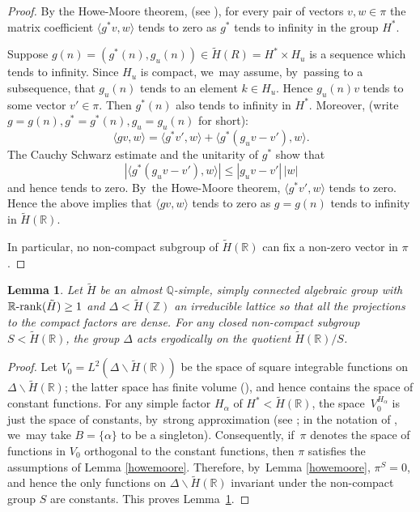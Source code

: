 \documentclass[JEP,XML,SOM,Unicode,published]{cedram}
\let\<\langle
\let\>\rangle
\newcommand{\Rrank}{\R\textup{-}\rank}
\newtheorem{lemma}{Lemma}
\theoremstyle{definition}
\newcommand{\field}[1]{\mathbb{#1}}
\newcommand{\Q}{\field{Q}}
\newcommand{\R}{\field{R}}
\newcommand{\Z}{\field{Z}}
\newcommand{\rank}{{\operatorname{rank}}}
\let\bs\backslash
\begin{document}
\begin{proof} By the Howe-Moore theorem, (see \cite[Th.\,(2.2.20)]{Z}), for every pair of vectors $v,w\in \pi$ the matrix coefficient $\<g^*v,w\>$ tends to zero as $g^*$ tends to infinity in the group $H^*$.

Suppose $g(n)=(g^*(n),g_u(n)) \in \tilde{H}(R)=H^* \times H_u$ is a sequence which tends to infinity. Since $H_u$ is compact, we~may assume, by~passing to a subsequence, that $g_u(n)$ tends to an element $k\in H_u$.
Hence $g_u(n)v$ tends to some vector $v'\in \pi$. Then $g^*(n)$ also tends to infinity in $H^*$. Moreover, (write $g=g(n), g^*=g^*(n),g_u=g_u(n)$ for short):
\[
\<gv,w\>=\<g^*v',w\>+ \<g^*(g_uv-v'),w\>.
\]
The Cauchy Schwarz estimate and the unitarity of $g^*$ show that
\[
|\<g^*(g_uv-v'),w\>| \leq | g_uv-v'|\, |w|
\]
and hence tends to zero. By~the Howe-Moore theorem, $\<g^*v',w\>$ tends to zero. Hence the above implies that $\<gv,w\>$ tends to zero as $g= g(n)$ tends to infinity in $\tilde{H}(\R)$.

In particular, no non-compact subgroup of $\tilde H(\R)$ can fix a non-zero vector in $\pi$.
\end{proof}

\begin{lemma}\label{mautner} Let $\tilde{H}$ be an almost $\Q$-simple, simply connected algebraic group with
$\Rrank(\tilde{H})\geq 1$ and $\Delta <\tilde{H}(\Z)$ an irreducible lattice so that all the projections to the compact factors are dense. For any closed non-compact subgroup $S<\tilde{H}(\R)$, the group $\Delta$ acts ergodically on the quotient $\tilde{H}(\R)/S$.
\end{lemma}

\begin{proof} Let $V_0=L^2(\Delta \bs \tilde H(\R))$ be the space of square integrable functions on $\Delta \bs \tilde H(\R)$; the latter space has finite volume (\cite[Th.\,1]{BHC}),
and hence contains the space of constant functions. For any simple factor $H_{\alpha }$ of $H^*< \tilde H(\R)$, the space~$V_0^{H_{\alpha }}$ is just the space of constants, by~strong approximation (see \cite[Chap.\,II, Th.\,(6.7)]{M}; in the notation of \cite{M}, we~may take $B=\{{\alpha \}}$ to be a singleton). Consequently, if~$\pi $ denotes the space of functions in $V_0$ orthogonal to the constant functions, then $\pi $ satisfies the assumptions of Lemma \ref{howemoore}. Therefore, by~Lemma \ref{howemoore}, $\pi ^S=0$, and
hence the only functions on $\Delta \bs \tilde H(\R)$ invariant under the non-compact group $S$ are constants. This proves Lemma~\ref{mautner}.
\end{proof}
\end{document}
